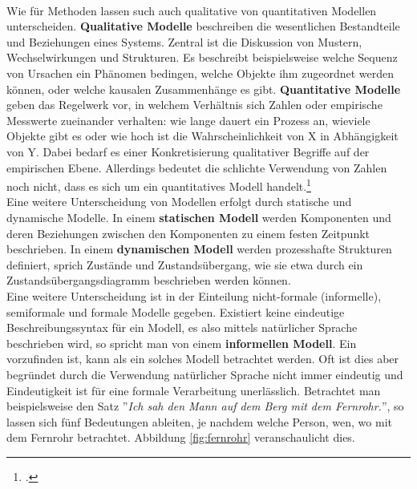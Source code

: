 \documentclass[12pt,a4paper]{article}
\begin{document}
\\
Wie für Methoden lassen such auch qualitative von quantitativen Modellen unterscheiden. \textbf{Qualitative Modelle} beschreiben die wesentlichen Bestandteile und Beziehungen eines Systems. Zentral ist die Diskussion von Mustern, Wechselwirkungen und Strukturen. Es beschreibt beispielsweise welche Sequenz von Ursachen ein Phänomen bedingen, welche Objekte ihm zugeordnet werden können, oder welche kausalen Zusammenhänge es gibt. \textbf{Quantitative Modelle} geben das Regelwerk vor, in welchem Verhältnis sich Zahlen oder empirische Messwerte zueinander verhalten: wie lange dauert ein Prozess an, wieviele Objekte gibt es oder wie hoch ist die Wahrscheinlichkeit von X in Abhängigkeit von Y. Dabei bedarf es einer Konkretisierung qualitativer Begriffe auf der empirischen Ebene. Allerdings bedeutet die schlichte Verwendung von Zahlen noch nicht, dass es sich um ein quantitatives Modell handelt.\footcite[][S.309–329]{wolf1995qualitative}
\\ 
Eine weitere Unterscheidung von Modellen erfolgt durch statische und dynamische Modelle. In einem \textbf{statischen Modell} werden Komponenten und deren Beziehungen zwischen den Komponenten zu einem festen Zeitpunkt beschrieben. In einem \textbf{dynamischen Modell} werden prozesshafte Strukturen definiert, sprich Zustände und Zustandsübergang, wie sie etwa durch ein Zustandsübergangsdiagramm beschrieben werden können.
\\
Eine weitere Unterscheidung ist in der Einteilung nicht-formale (informelle), semiformale und formale Modelle gegeben. Existiert keine eindeutige Beschreibungssyntax für ein Modell, es also mittels natürlicher Sprache beschrieben wird, so spricht man von einem \textbf{informellen Modell}. Ein vorzufinden ist, kann als ein solches Modell betrachtet werden. Oft ist dies aber begründet durch die Verwendung natürlicher Sprache nicht immer eindeutig und Eindeutigkeit ist für eine formale Verarbeitung unerlässlich. Betrachtet man beispielsweise den Satz ''\textit{Ich sah den Mann auf dem Berg mit dem Fernrohr.}'', so lassen sich fünf Bedeutungen ableiten, je nachdem welche Person, wen, wo mit dem Fernrohr betrachtet. Abbildung \ref{fig:fernrohr} veranschaulicht dies.
\end{document}
